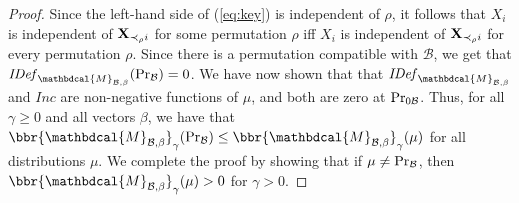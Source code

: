 \documentclass[letterpaper]{article} %
\theoremstyle{plain}
\theoremstyle{definition}
\theoremstyle{remark}
\newcommand{\dg}[1]{\mathbdcal{#1}}
\newcommand{\IDef}[1]{\mathit{IDef}_{#1}}
\newcommand\Inc{\mathit{Inc}}
\newcommand{\PDGof}[1]{{\dg M}_{#1}}
\begin{document}
\begin{proof}
Since the left-hand side of (\ref{eq:key}) is independent of $\rho$,
it follows that $X_i$ is independent of 
${\bf X}_{\prec_\rho i}$ for some permutation $\rho$ iff $X_i$ is independent of
  ${\bf X}_{\prec_\rho i}$ for every permutation $\rho$.  Since there
is a permutation compatible with $\mathcal B$, we get that 
$\IDef{\PDGof{\mathcal B,\beta}}(\Pr_{\cal B}) = 0$.
We have now shown that that $\IDef{\PDGof{\mathcal B, \beta}}$ and $\Inc$ are 
non-negative functions of $\mu$, and both are zero at $\Pr_{0\cal B}$. 
Thus, for all $\gamma \geq 0$ and all vectors $\beta$, we
have that   $\bbr{\PDGof{\mathcal B, \beta}}_\gamma( \Pr_{\cal
  B}) \le \bbr{\PDGof{\mathcal B, \beta}}_\gamma( \mu)$ for all
distributions $\mu$.  We complete the proof by showing that if
$\mu \ne \Pr_{\cal B}$, then 
$\bbr{\PDGof{\mathcal B, \beta}}_\gamma(\mu) > 0$
for $\gamma > 0$.


\end{proof}
\end{document}
